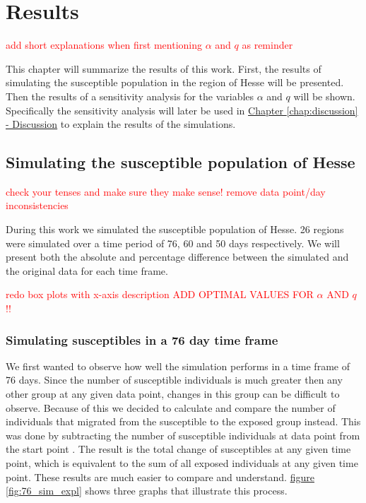 
\chapter{Results} %
\textcolor{red}{add short explanations when first mentioning $\alpha$ and $q$ as reminder}

\label{chap:results} %
This chapter will summarize the results of this work. First, the results of simulating the susceptible population
in the region of Hesse will be presented. Then the results of a sensitivity analysis for the variables $\alpha$ and
$q$ will be shown. Specifically the sensitivity analysis will later be used in \hyperref[chap:discussion]{Chapter
\ref*{chap:discussion} - Discussion} to explain the results of the simulations.



\section{Simulating the susceptible population of Hesse}
\textcolor{red}{check your tenses and make sure they make sense!}
\textcolor{red}{remove data point/day inconsistencies}

During this work we simulated the susceptible population of Hesse. 26 regions were simulated over a time period of
76, 60 and 50 days respectively. We will present both the absolute and percentage difference between the simulated
and the original data for each time frame.

\textcolor{red}{redo box plots with x-axis description}
\textcolor{red}{ADD OPTIMAL VALUES FOR $\alpha$ AND $q$!!}
\subsection{Simulating susceptibles in a 76 day time frame}
We first wanted to observe how well the simulation performs in a time frame of 76 days. Since the number of susceptible
individuals is much greater then any other group at any given data point, changes in this group can be difficult to
observe. Because of this we decided to calculate and compare the number of individuals that migrated from the susceptible
to the exposed group instead. This was done by subtracting the number of susceptible individuals at data point  from
the start point . The result is the total change of susceptibles at any given time point, which is equivalent to the 
sum of all exposed individuals at any given time point. These results are much easier to compare and understand.
\hyperref[fig:76_sim_expl]{figure \ref*{fig:76_sim_expl}} shows three graphs that illustrate this process.


